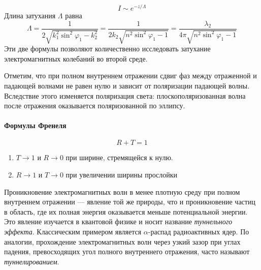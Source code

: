 \documentclass[a4paper, 12pt]{article}
\begin{document}
	\begin{equation}
		I\sim e^{-z/\Lambda}
		\label{eq:19}
	\end{equation}
	Длина затухания $\Lambda$ равна
	\begin{equation}
		\Lambda=\frac{1}{2\sqrt{k_1^2\sin^2\varphi_1-k_2^2}}=\frac{1}{2k_2\sqrt{n^2\sin^2\varphi_1-1}}=\frac{\lambda_2}{4\pi\sqrt{n^2\sin^2\varphi_1-1}}
		\label{eq:20}
	\end{equation}
	Эти две формулы позволяют количественно исследовать затухание электромагнитных колебаний во второй среде.\par
	Отметим, что при полном внутреннем отражении сдвиг фаз между отраженной и падающей волнами не равен нулю и зависит от поляризации падающей волны. Вследствие этого изменяется поляризация света: плоскополяризованная волна после отражения оказывается поляризованной по эллипсу.\par
	\paragraph{Формулы Френеля}
	\begin{equation}
		R+T=1
	\end{equation}
	\begin{enumerate}
		\item $T\rightarrow 1$ и $R\rightarrow 0$ при ширине, стремящейся к нулю.
		\item $R\rightarrow 1$ и $T\rightarrow 0$ при увеличении ширины прослойки
	\end{enumerate}
	Проникновение электромагнитных волн в менее плотную среду при полном внутреннем отражении — явление той же природы, что и проникновение частиц в область, где их полная энергия оказывается меньше потенциальной энергии. Это явление изучается в квантовой физике и носит название \textit{туннельного эффекта}. Классическим примером является $\alpha$-распад радиоактивных ядер. По аналогии, прохождение электромагнитных волн через узкий зазор при углах падения, превосходящих угол полного внутреннего отражения, часто называют \textit{туннелированием}.
\end{document}
